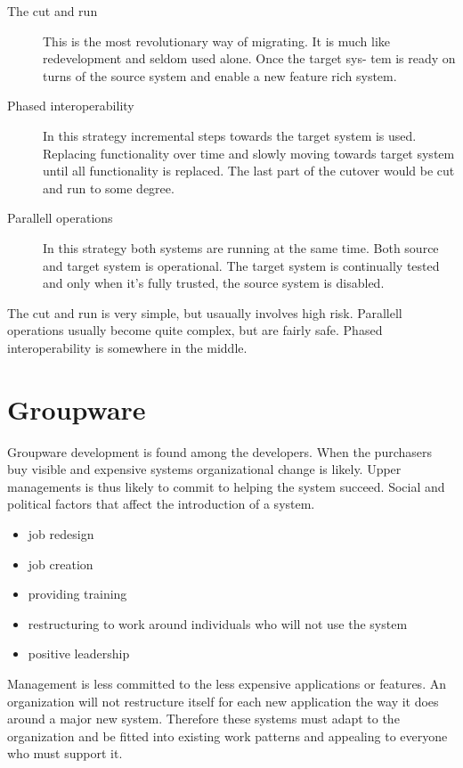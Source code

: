 \begin{description}
\item[The cut and run] This is the most revolutionary way of migrating. It is
much like redevelopment and seldom used alone. Once the target sys-
tem is ready on turns of the source system and enable a new feature
rich system.

\item[Phased interoperability] In this strategy incremental steps towards the
target system is used. Replacing functionality over time and slowly
moving towards target system until all functionality is replaced. The
last part of the cutover would be cut and run to some degree.

\item[Parallell operations] In this strategy both systems are running at the same
time. Both source and target system is operational. The target system
is continually tested and only when it's fully trusted, the source system
is disabled.
\end{description}

The cut and run is very simple, but usaually involves high risk. Parallell
operations usually become quite complex, but are fairly safe. Phased interoperability is somewhere in the middle.

\cite{leg:jdbj}


\section{Groupware}
Groupware development is found among the developers.
When the purchasers buy visible and expensive systems organizational change is likely.
Upper managements is thus likely to commit to helping the system succeed.
Social and political factors that affect the introduction of a system.
\begin{itemize}
\item job redesign 
\item job creation
\item providing training
\item restructuring to work around individuals who will not use the system
\item positive leadership
\end{itemize}

Management is less committed to the less expensive applications or features.
An organization will not restructure itself for each new application the way it does around a major new system. Therefore these systems must adapt to the organization and be fitted into existing work patterns and appealing to everyone who must support it. 

